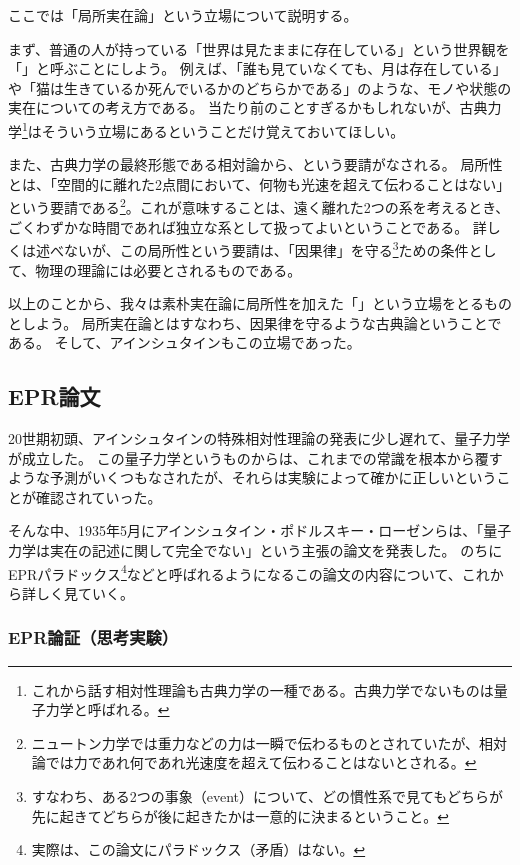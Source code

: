 \documentclass[10pt,b5paper,papersize,dvipdfmx]{jsbook}
\begin{document}
ここでは「局所実在論」という立場について説明する。
\par
まず、普通の人が持っている「世界は見たままに存在している」という世界観を「」と呼ぶことにしよう。
例えば、「誰も見ていなくても、月は存在している」や「猫は生きているか死んでいるかのどちらかである」のような、モノや状態の実在についての考え方である。
当たり前のことすぎるかもしれないが、古典力学\footnote{
  これから話す相対性理論も古典力学の一種である。古典力学でないものは量子力学と呼ばれる。
}はそういう立場にあるということだけ覚えておいてほしい。
\par
また、古典力学の最終形態である相対論から、という要請がなされる。
局所性とは、「空間的に離れた2点間において、何物も光速を超えて伝わることはない」という要請である\footnote{
  ニュートン力学では重力などの力は一瞬で伝わるものとされていたが、相対論では力であれ何であれ光速度を超えて伝わることはないとされる。
}。これが意味することは、遠く離れた2つの系を考えるとき、ごくわずかな時間であれば独立な系として扱ってよいということである。
詳しくは述べないが、この局所性という要請は、「因果律」を守る\footnote{
  すなわち、ある2つの事象（event）について、どの慣性系で見てもどちらが先に起きてどちらが後に起きたかは一意的に決まるということ。
}ための条件として、物理の理論には必要とされるものである。
\par
以上のことから、我々は素朴実在論に局所性を加えた「」という立場をとるものとしよう。
局所実在論とはすなわち、因果律を守るような古典論ということである。
そして、アインシュタインもこの立場であった。


%
\subsection{EPR論文} %
%

20世期初頭、アインシュタインの特殊相対性理論の発表に少し遅れて、量子力学が成立した。
この量子力学というものからは、これまでの常識を根本から覆すような予測がいくつもなされたが、それらは実験によって確かに正しいということが確認されていった。
\par
そんな中、1935年5月にアインシュタイン・ポドルスキー・ローゼンらは、「量子力学は実在の記述に関して完全でない」という主張の論文を発表した。
のちにEPRパラドックス\footnote{
  実際は、この論文にパラドックス（矛盾）はない。
}などと呼ばれるようになるこの論文の内容について、これから詳しく見ていく。

%
\subsubsection{EPR論証（思考実験）} %
\end{document}
